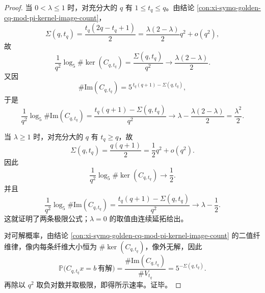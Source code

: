 \begin{proof}
当 \(0<\lambda\le 1\) 时，对充分大的 \(q\) 有 \(1\le t_q\le q\)。由结论 \ref{con:xi-symq-golden-cq-mod-pi-kernel-image-count}，
\[
\Sigma(q,t_q)=\frac{t_q(2q-t_q+1)}{2}
=
\frac{\lambda(2-\lambda)}{2}q^2+o(q^2),
\]
故
\[
\frac{1}{q^2}\log_5\#\ker(C_{q,t_q})
=
\frac{\Sigma(q,t_q)}{q^2}
\longrightarrow
\frac{\lambda(2-\lambda)}{2}.
\]
又因
\[
\#\mathrm{Im}(C_{q,t_q})=5^{\,t_q(q+1)-\Sigma(q,t_q)},
\]
于是
\[
\frac{1}{q^2}\log_5\#\mathrm{Im}(C_{q,t_q})
=
\frac{t_q(q+1)-\Sigma(q,t_q)}{q^2}
\longrightarrow
\lambda-\frac{\lambda(2-\lambda)}{2}
=
\frac{\lambda^2}{2}.
\]

当 \(\lambda\ge 1\) 时，对充分大的 \(q\) 有 \(t_q\ge q\)，故
\[
\Sigma(q,t_q)=\frac{q(q+1)}{2}
=
\frac12 q^2+o(q^2).
\]
因此
\[
\frac{1}{q^2}\log_5\#\ker(C_{q,t_q})\longrightarrow \frac12.
\]
并且
\[
\frac{1}{q^2}\log_5\#\mathrm{Im}(C_{q,t_q})
=
\frac{t_q(q+1)-\Sigma(q,t_q)}{q^2}
\longrightarrow
\lambda-\frac12.
\]
这就证明了两条极限公式；\(\lambda=0\) 的取值由连续延拓给出。

对可解概率，由结论 \ref{con:xi-symq-golden-cq-mod-pi-kernel-image-count} 的二值纤维律，像内每条纤维大小恒为 \(\#\ker(C_{q,t_q})\)，像外无解，因此
\[
\mathbb P\!\bigl(C_{q,t_q}x=b\ \text{有解}\bigr)
=
\frac{\#\mathrm{Im}(C_{q,t_q})}{\#V_{t_q}}
=
5^{-\Sigma(q,t_q)}.
\]
再除以 \(q^2\) 取负对数并取极限，即得所示速率。证毕。
\end{proof}

